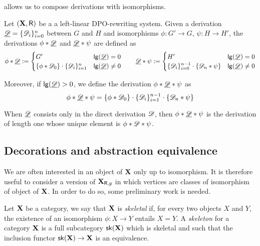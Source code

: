  allows us to compose derivations with isomorphisms.

\begin{definition} Let $(\textbf {\textup{X}}, \mathsf{R})$ be a a left-linear DPO-rewriting system. Given a derivation $\underline{\mathscr{D}}=\{\mathscr{D}_{i}\}_{i=0}^n$ between $G$ and $H$ and isomorphisms $\phi\colon G'\to G$, $\psi\colon H\to H'$, the derivations  $\phi*\underline{\mathscr{D}}$ and $\underline{\mathscr{D}}*\psi$ are defined as
	\[\phi *\underline{\mathscr{D}} := \begin{cases}
		G' & \mathsf{lg}(\underline{\mathscr{D}})=0\\ 
		\{\phi* \mathscr{D}_0\}\cdot \{\mathscr{D}_i\}_{i=1}^{n}  & \mathsf{lg}(\underline{\mathscr{D}})\neq 0
	\end{cases} \qquad \underline{\mathscr{D}}*\psi := \begin{cases}
		H' & \mathsf{lg}(\underline{\mathscr{D}})=0\\ 
		\{\mathscr{D}_i\}_{i=0}^{n-1} \cdot \{\mathscr{D}_n*\psi\} & \mathsf{lg}(\underline{\mathscr{D}})\neq 0
	\end{cases}\] 
	
	Moreover, if $\mathsf{lg}(\underline{\mathscr{D}})>0$,  we define the derivation $\phi *\underline{\mathscr{D}} * \psi$ as
	\[\phi *\underline{\mathscr{D}} * \psi = \{\phi* \mathscr{D}_0\}\cdot \{\mathscr{D}_i\}_{i=1}^{n-1} \cdot \{\mathscr{D}_n*\psi\}\] 
\end{definition}

\begin{remark}
	When $\underline{\mathscr{D}}$ consists only in the direct derivation $\mathscr{D}$, then $\phi*\underline{\mathscr{D}}*\psi$ is the derivation of length one whose unique element is $\phi*\mathscr{D}*\psi$.
\end{remark}

\subsection{Decorations and abstraction equivalence}
We are often interested in an object of $\textbf {\textup{X}}$ only up to isomorphism. It is therefore useful to consider a version of $\textbf {\textup{X}}_{\mathsf{R}, g}$ in which vertices are classes of isomorphism of object of $\textbf {\textup{X}}$. In order to do so, some preliminary work is needed.

\begin{definition}\cite{mac2013categories}
	Let $\textbf {\textup{X}}$ be a category, we say that  $\textbf {\textup{X}}$ is \emph{skeletal} if, for every two objects $X$ and $Y$, the existence of an isomorphism $\phi\colon X\to Y$ entails $X=Y$. A \emph{skeleton} for a category $\textbf {\textup{X}}$ is a full subcategory $\mathsf{sk}(\textbf {\textup{X}})$ which is skeletal and such that the inclusion functor $\mathsf{sk}(\textbf {\textup{X}})\to \textbf {\textup{X}}$ is an equivalence. 
\end{definition}

